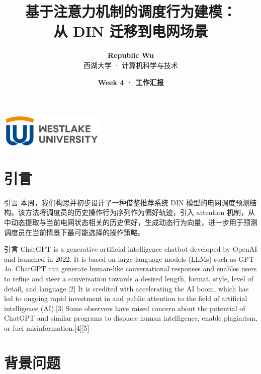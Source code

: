 \documentclass[11pt]{beamer}
\title{\textbf{基于注意力机制的调度行为建模：\\从 DIN 迁移到电网场景}}
\author[Republic]{\textbf{Republic Wu}\\{\small 西湖大学 · 计算机科学与技术}}
\institute[]{\textit{Westlake University} \\ \vspace{0.2em} Department of Computer Science and Technology}
\date{\textbf{Week 4 · 工作汇报}}
\begin{document}

\begin{frame}
\titlepage
\begin{center}
  \includegraphics[width=5cm]{./pic/logo3.png}
\end{center}
\end{frame}


\section{引言}

\begin{frame}{引言}
 本周，我们构思并初步设计了一种借鉴推荐系统 DIN 模型的电网调度预测结构。该方法将调度员的历史操作行为序列作为偏好轨迹，引入 attention 机制，从中动态提取与当前电网状态相关的历史偏好，生成动态行为向量，进一步用于预测调度员在当前情景下最可能选择的操作策略。
\end{frame}


\begin{frame}{引言}
  ChatGPT is a generative artificial intelligence chatbot developed by OpenAI and launched in 2022. It is based on large language models (LLMs) such as GPT-4o. ChatGPT can generate human-like conversational responses and enables users to refine and steer a conversation towards a desired length, format, style, level of detail, and language.[2] It is credited with accelerating the AI boom, which has led to ongoing rapid investment in and public attention to the field of artificial intelligence (AI).[3] Some observers have raised concern about the potential of ChatGPT and similar programs to displace human intelligence, enable plagiarism, or fuel misinformation.[4][5]

 \end{frame}



\section{背景问题}
\end{document}
